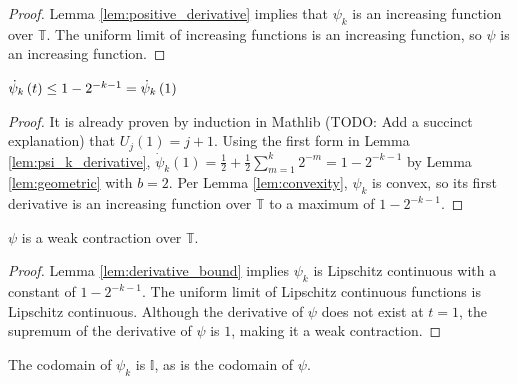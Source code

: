 \begin{proof}
  \leanok
  Lemma \ref{lem:positive_derivative} implies that $\psi_k$ is an increasing function over $\mathbb{T}$. The uniform limit of increasing functions is an increasing function, so $\psi$ is an increasing function.
\end{proof}

\begin{lemma}
  \label{lem:derivative_bound}
  \leanok
  $\dot{\psi}_{k}\left(t\right) \leq 1 - 2^{-k - 1} = \dot{\psi}_k\left(1\right)$
\end{lemma}

\begin{proof}
  \leanok
  It is already proven by induction in Mathlib (TODO: Add a succinct explanation) that $U_j\left(1\right) = j + 1$. Using the first form in Lemma \ref{lem:psi_k_derivative}, $\dot{\psi}_k\left(1\right) = \frac{1}{2} + \frac{1}{2} \sum\limits_{m = 1}^k 2^{-m} = 1 - 2^{-k - 1}$ by Lemma \ref{lem:geometric} with $b = 2$. Per Lemma \ref{lem:convexity}, $\psi_k$ is convex, so its first derivative is an increasing function over $\mathbb{T}$ to a maximum of $1 - 2^{-k - 1}$.
\end{proof}

\begin{lemma}
  \label{lem:contraction}
  \leanok
  $\psi$ is a weak contraction over $\mathbb{T}$.
\end{lemma}

\begin{proof}
  \leanok
  Lemma \ref{lem:derivative_bound} implies $\psi_k$ is Lipschitz continuous with a constant of $1 - 2^{-k - 1}$. The uniform limit of Lipschitz continuous functions is Lipschitz continuous. Although the derivative of $\psi$ does not exist at $t = 1$, the supremum of the derivative of $\psi$ is $1$, making it a weak contraction.
\end{proof}

\begin{lemma}
  \label{lem:codomain}
  \leanok
  The codomain of $\psi_k$ is $\mathbb{I}$, as is the codomain of $\psi$.
\end{lemma}

